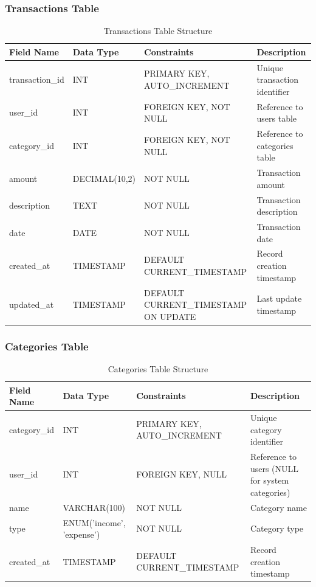 \documentclass[12pt,a4paper]{article}
\begin{document}
\subsubsection{Transactions Table}
\begin{table}[H]
    \centering
    \caption{Transactions Table Structure}
    \label{tab:transactions_table}
    \begin{tabular}{@{}llll@{}}
        \toprule
        \textbf{Field Name} & \textbf{Data Type} & \textbf{Constraints} & \textbf{Description} \\
        \midrule
        transaction\_id & INT & PRIMARY KEY, AUTO\_INCREMENT & Unique transaction identifier \\
        user\_id & INT & FOREIGN KEY, NOT NULL & Reference to users table \\
        category\_id & INT & FOREIGN KEY, NOT NULL & Reference to categories table \\
        amount & DECIMAL(10,2) & NOT NULL & Transaction amount \\
        description & TEXT & NOT NULL & Transaction description \\
        date & DATE & NOT NULL & Transaction date \\
        created\_at & TIMESTAMP & DEFAULT CURRENT\_TIMESTAMP & Record creation timestamp \\
        updated\_at & TIMESTAMP & DEFAULT CURRENT\_TIMESTAMP ON UPDATE & Last update timestamp \\
        \bottomrule
    \end{tabular}
\end{table}

\subsubsection{Categories Table}
\begin{table}[H]
    \centering
    \caption{Categories Table Structure}
    \label{tab:categories_table}
    \begin{tabular}{@{}llll@{}}
        \toprule
        \textbf{Field Name} & \textbf{Data Type} & \textbf{Constraints} & \textbf{Description} \\
        \midrule
        category\_id & INT & PRIMARY KEY, AUTO\_INCREMENT & Unique category identifier \\
        user\_id & INT & FOREIGN KEY, NULL & Reference to users (NULL for system categories) \\
        name & VARCHAR(100) & NOT NULL & Category name \\
        type & ENUM('income', 'expense') & NOT NULL & Category type \\
        created\_at & TIMESTAMP & DEFAULT CURRENT\_TIMESTAMP & Record creation timestamp \\
        \bottomrule
    \end{tabular}
\end{table}
\end{document}
